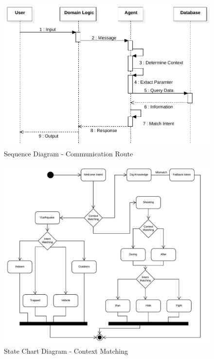 \documentclass{scrreprt}
\begin{document}
\begin{figure}[ht!]
    \centering
    \includegraphics[angle=90, height=.95\textheight]{imgs/SequenceDiagram1.pdf}
    
    \caption{Sequence Diagram - Communication Route}
    \label{fig:sequencediagram1}
\end{figure}

\clearpage



\begin{figure}[ht!]
    \centering
    \includegraphics[angle=90, width=.95\textwidth]{img3/state1.pdf}
    \caption{State Chart Diagram - Context Matching}
    \label{fig:statechartdiagram1}
\end{figure}
\end{document}
